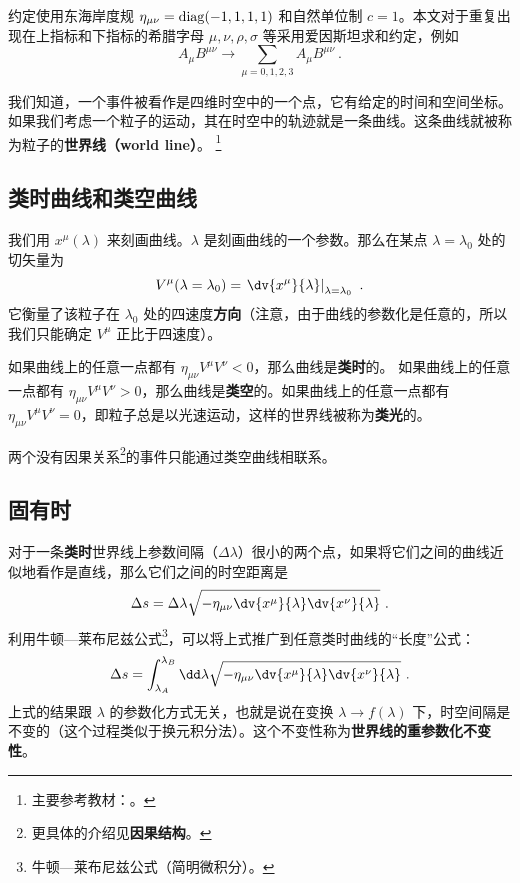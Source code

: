 

约定使用东海岸度规 $\eta_{\mu\nu}=\rm{diag}(-1,1,1,1)$ 和自然单位制 $c=1$。本文对于重复出现在上指标和下指标的希腊字母 $\mu,\nu,\rho,\sigma$ 等采用爱因斯坦求和约定，例如
\begin{equation}
A_\mu B^{\mu\nu}\rightarrow \sum_{\mu=0,1,2,3}A_\mu B^{\mu\nu} ~.
\end{equation}


我们知道，一个事件被看作是四维时空中的一个点，它有给定的时间和空间坐标。如果我们考虑一个粒子的运动，其在时空中的轨迹就是一条曲线。这条曲线就被称为粒子的\textbf{世界线（world line）}。
\footnote{主要参考教材：\cite{陈斌广相}。}

\subsection{类时曲线和类空曲线}
我们用 $x^\mu(\lambda)$ 来刻画曲线。$\lambda$ 是刻画曲线的一个参数。那么在某点 $\lambda=\lambda_0$ 处的切矢量为
\begin{equation}
\begin{aligned}
V^\mu(\lambda=\lambda_0)=\left.\dv{x^\mu}{\lambda}\right|_{\lambda=\lambda_0}~.
\end{aligned}
\end{equation}
它衡量了该粒子在 $\lambda_0$ 处的四速度\textbf{方向}（注意，由于曲线的参数化是任意的，所以我们只能确定 $V^\mu$ 正比于四速度）。

如果曲线上的任意一点都有 $\eta_{\mu\nu}V^\mu V^\nu<0$，那么曲线是\textbf{类时}的。
如果曲线上的任意一点都有 $\eta_{\mu\nu}V^\mu V^\nu>0$，那么曲线是\textbf{类空}的。如果曲线上的任意一点都有 $\eta_{\mu\nu}V^\mu V^\nu=0$，即粒子总是以光速运动，这样的世界线被称为\textbf{类光}的。

两个没有因果关系\footnote{更具体的介绍见\textbf{因果结构}。}的事件只能通过类空曲线相联系。

\subsection{固有时}
对于一条\textbf{类时}世界线上参数间隔（$\Delta \lambda$）很小的两个点，如果将它们之间的曲线近似地看作是直线，那么它们之间的时空距离是
\begin{equation}
\Delta s=\Delta \lambda \sqrt{-\eta_{\mu\nu}\dv{x^\mu}{\lambda} \dv{x^\nu}{\lambda}}~.
\end{equation}
利用牛顿—莱布尼兹公式\footnote{牛顿—莱布尼兹公式（简明微积分）。}，可以将上式推广到任意类时曲线的“长度”公式：
\begin{equation}\label{eq_wdline_2}
\Delta s=\int_{\lambda_A}^{\lambda_B} \dd\lambda \sqrt{-\eta_{\mu\nu}\dv{x^\mu}{\lambda} \dv{x^\nu}{\lambda}}~.
\end{equation}
上式的结果跟 $\lambda$ 的参数化方式无关，也就是说在变换 $\lambda\rightarrow f(\lambda)$ 下，时空间隔是不变的（这个过程类似于换元积分法）。这个不变性称为\textbf{世界线的重参数化不变性}。

